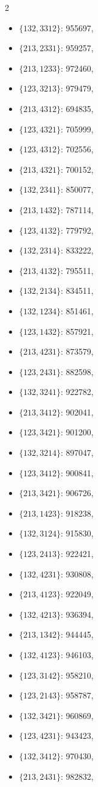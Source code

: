\documentclass[11pt]{amsart}
\theoremstyle{plain}
\theoremstyle{definition}
\begin{document}
{\begin{multicols}{2}
\begin{itemize}
\item $\{132,3312\}$: 955697,
\item $\{213,2331\}$: 959257,
\item $\{213,1233\}$: 972460,
\item $\{123,3213\}$: 979479,
\item $\{213,4312\}$: 694835,
\item $\{123,4321\}$: 705999,
\item $\{123,4312\}$: 702556,
\item $\{213,4321\}$: 700152,
\item $\{132,2341\}$: 850077,
\item $\{213,1432\}$: 787114,
\item $\{123,4132\}$: 779792,
\item $\{132,2314\}$: 833222,
\item $\{213,4132\}$: 795511,
\item $\{132,2134\}$: 834511,
\item $\{132,1234\}$: 851461,
\item $\{123,1432\}$: 857921,
\item $\{213,4231\}$: 873579,
\item $\{123,2431\}$: 882598,
\item $\{132,3241\}$: 922782,
\item $\{213,3412\}$: 902041,
\item $\{123,3421\}$: 901200,
\item $\{132,3214\}$: 897047,
\item $\{123,3412\}$: 900841,
\item $\{213,3421\}$: 906726,
\item $\{213,1423\}$: 918238,
\item $\{132,3124\}$: 915830,
\item $\{123,2413\}$: 922421,
\item $\{132,4231\}$: 930808,
\item $\{213,4123\}$: 922049,
\item $\{132,4213\}$: 936394,
\item $\{213,1342\}$: 944445,
\item $\{132,4123\}$: 946103,
\item $\{123,3142\}$: 958210,
\item $\{123,2143\}$: 958787,
\item $\{132,3421\}$: 960869,
\item $\{123,4231\}$: 943423,
\item $\{132,3412\}$: 970430,
\item $\{213,2431\}$: 982832,

\end{itemize}
\end{multicols}}
\end{document}
